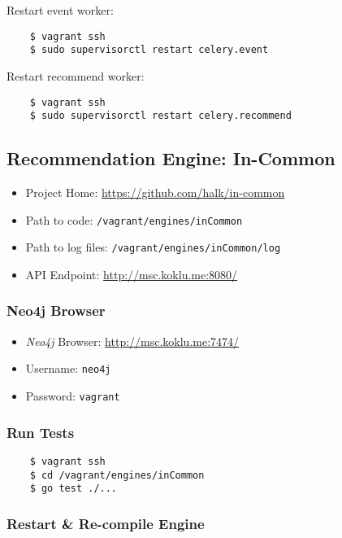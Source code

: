 Restart event worker:

\begin{verbatim}
    $ vagrant ssh
    $ sudo supervisorctl restart celery.event
\end{verbatim}

Restart recommend worker:

\begin{verbatim}
    $ vagrant ssh
    $ sudo supervisorctl restart celery.recommend
\end{verbatim}


\subsection{Recommendation Engine: In-Common}

\begin{itemize}
\item Project Home: \url{https://github.com/halk/in-common}
\item Path to code: \texttt{/vagrant/engines/inCommon}
\item Path to log files: \texttt{/vagrant/engines/inCommon/log}
\item API Endpoint: \url{http://msc.koklu.me:8080/}
\end{itemize}

\subsubsection{Neo4j Browser}

\begin{itemize}
\item \emph{Neo4j} Browser: \url{http://msc.koklu.me:7474/}
\item Username: \texttt{neo4j}
\item Password: \texttt{vagrant}
\end{itemize}

\subsubsection{Run Tests}

\begin{verbatim}
    $ vagrant ssh
    $ cd /vagrant/engines/inCommon
    $ go test ./...
\end{verbatim}

\subsubsection{Restart \& Re-compile Engine}

